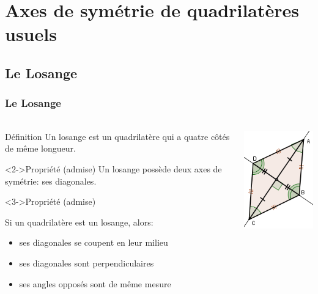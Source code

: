 \documentclass{beamer}
\begin{document}
\section{Axes de symétrie de quadrilatères usuels}

\subsection{Le Losange}

\begin{frame}
\frametitle{Le Losange}  
\framesubtitle{}

\begin{columns}[c]
	
	
	\begin{column}{9cm}
		
		\begin{block}{Définition}
			\small{Un losange est un quadrilatère qui a quatre côtés de même} longueur.
		\end{block}
		
		\begin{alertblock}<2->{Propriété (admise)}
			\small{Un losange possède deux axes de symétrie: ses diagonales.}
		\end{alertblock}
		
		\begin{alertblock}<3->{Propriété (admise)}
			\begin{small}
				
			 Si un quadrilatère est un losange, alors:
			 \begin{itemize}
			 	\item ses diagonales se coupent en leur milieu
			 	\item ses diagonales sont perpendiculaires
			 	\item ses angles opposés sont de même mesure
			 \end{itemize}
			 \end{small}
		\end{alertblock}
		

		
	\end{column}
	
	\begin{column}{2cm}
		\includegraphics[scale=0.5]{./img/losange}
	\end{column}
	
\end{columns}

\end{frame}
\end{document}
